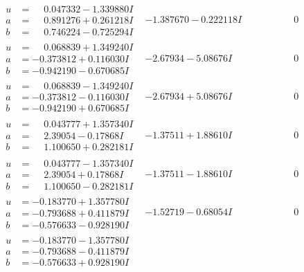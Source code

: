 \documentclass[1p]{elsarticle_modified}
\theoremstyle{definition}
\begin{document}
$$\begin{array}{c|c|c}
 \hline 
\begin{aligned}
u &= \phantom{-}0.047332 - 1.339880 I \\
a &= \phantom{-}0.891276 + 0.261218 I \\
b &= \phantom{-}0.746224 - 0.725294 I\end{aligned}
 & -1.387670 - 0.222118 I & \phantom{-0.000000 } 0 \\ \hline\begin{aligned}
u &= \phantom{-}0.068839 + 1.349240 I \\
a &= -0.373812 + 0.116030 I \\
b &= -0.942190 - 0.670685 I\end{aligned}
 & -2.67934 - 5.08676 I & \phantom{-0.000000 } 0 \\ \hline\begin{aligned}
u &= \phantom{-}0.068839 - 1.349240 I \\
a &= -0.373812 - 0.116030 I \\
b &= -0.942190 + 0.670685 I\end{aligned}
 & -2.67934 + 5.08676 I & \phantom{-0.000000 } 0 \\ \hline\begin{aligned}
u &= \phantom{-}0.043777 + 1.357340 I \\
a &= \phantom{-}2.39054 - 0.17868 I \\
b &= \phantom{-}1.100650 + 0.282181 I\end{aligned}
 & -1.37511 + 1.88610 I & \phantom{-0.000000 } 0 \\ \hline\begin{aligned}
u &= \phantom{-}0.043777 - 1.357340 I \\
a &= \phantom{-}2.39054 + 0.17868 I \\
b &= \phantom{-}1.100650 - 0.282181 I\end{aligned}
 & -1.37511 - 1.88610 I & \phantom{-0.000000 } 0 \\ \hline\begin{aligned}
u &= -0.183770 + 1.357780 I \\
a &= -0.793688 + 0.411879 I \\
b &= -0.576633 - 0.928190 I\end{aligned}
 & -1.52719 - 0.68054 I & \phantom{-0.000000 } 0 \\ \hline\begin{aligned}
u &= -0.183770 - 1.357780 I \\
a &= -0.793688 - 0.411879 I \\
b &= -0.576633 + 0.928190 I\end{aligned}

\end{array}$$
\end{document}
